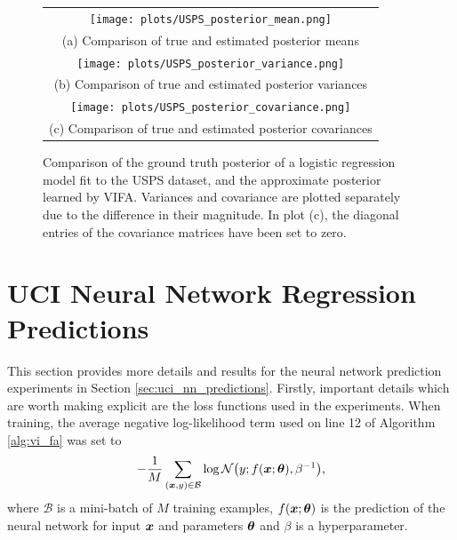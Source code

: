 \documentclass[10pt]{article} %
\begin{document}
\begin{figure}[!htbp] 
	\begin{tabular}{c}
		\texttt{[image: plots/USPS\_posterior\_mean.png]} \\
		(a) Comparison of true and estimated posterior means \\[6pt] 
		 \texttt{[image: plots/USPS\_posterior\_variance.png]} \\
		(b) Comparison of true and estimated posterior variances \\[6pt] 
		\texttt{[image: plots/USPS\_posterior\_covariance.png]} \\
		(c) Comparison of true and estimated posterior covariances \\[6pt] 
	\end{tabular}
	\caption{Comparison of the ground truth posterior of a logistic regression model fit to the USPS dataset, and the approximate posterior learned by VIFA. Variances and covariance are plotted separately due to the difference in their magnitude. In plot (c), the diagonal entries of the covariance matrices have been set to zero.}
	\label{fig:posterior_USPS}
\end{figure}


\section{UCI Neural Network Regression Predictions}\label{app:uci_nn_predictions}

This section provides more details and results for the neural network prediction experiments in Section \ref{sec:uci_nn_predictions}. Firstly, important details which are worth making explicit are the loss functions used in the experiments. When training, the average negative log-likelihood term used on line 12 of Algorithm \ref{alg:vi_fa} was set to
\begin{equation}\label{eqn:train_nll}
	-\frac{1}{M} \sum_{({\bm{x}}, y) \in \mathcal{B}} \log \mathcal{N}\big(y; f({\bm{x}}; {\bm{\theta}}), \beta^{-1}\big),
\end{equation}
where $\mathcal{B}$ is a mini-batch of $M$ training examples, $f({\bm{x}}; {\bm{\theta}})$ is the prediction of the neural network for input ${\bm{x}}$ and parameters ${\bm{\theta}}$ and $\beta$ is a hyperparameter. 
\end{document}
